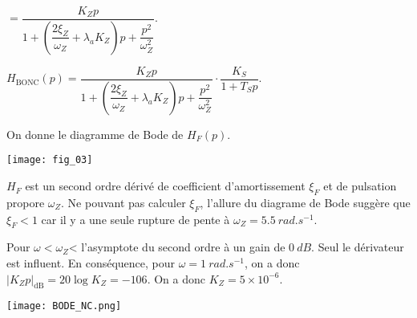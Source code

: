 \begin{multicols}{2}
\begin{multicols}{2}
\begin{corrige}
$= \dfrac{K_Z p}{ 1+\left(\dfrac{2\xi_Z}{\omega_Z}+\lambda_a K_Z\right)p+\dfrac{p^2}{\omega_Z^2} }$.
\end{corrige}
\else
\fi

\ifprof
\begin{corrige}
$H_{\text{BONC}}(p) = \dfrac{K_Z p}{ 1+\left(\dfrac{2\xi_Z}{\omega_Z}+\lambda_a K_Z\right)p+\dfrac{p^2}{\omega_Z^2} } \cdot \dfrac{K_S}{1+T_Sp} $.
\end{corrige}
\else
\fi


\ifprof
\else
On donne le diagramme de Bode de $H_F(p)$.

\begin{center}
\texttt{[image: fig\_03]}
\end{center}
\fi

\ifprof
\begin{corrige}
$H_F$ est un second ordre dérivé de coefficient d'amortissement $\xi_{F}$ et de pulsation propore $\omega_{Z}$. Ne pouvant pas calculer $\xi_{F}$, l'allure du diagrame de Bode suggère que $\xi_{F}<1$ car il y a une seule rupture de pente à $\omega_Z= \SI{5,5}{rad.s^{-1}}$.

Pour $\omega<\omega_Z$< l'asymptote du second ordre à un gain de $\SI{0}{dB}$. Seul le dérivateur est influent. En conséquence, pour $\omega =\SI{1}{rad.s^{-1}}$, on a donc $\left| K_Z p\right|_{\text{dB}}=20\log K_Z=-106$. On a donc $K_Z=5\times 10^{-6}$. 

\begin{center}
\texttt{[image: BODE\_NC.png]}
\end{center}
\end{corrige}
\else
\fi


\end{multicols}
\end{multicols}
